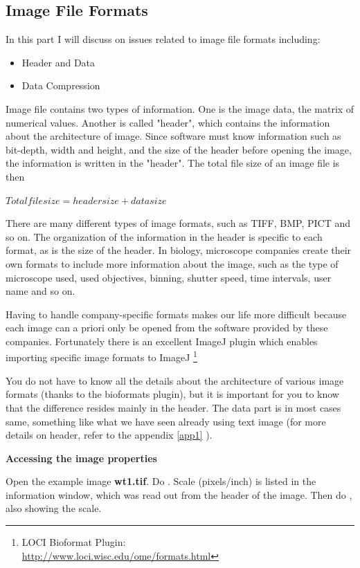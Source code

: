 \subsection{Image File Formats}

In this part I will discuss on issues related to image file formats including:

\begin{itemize}
	\item Header and Data
	\item Data Compression
\end{itemize}

Image file contains two types of information. 
One is the image data, the matrix of numerical values. 
Another is called "header", which contains the information about the architecture of image. 
Since software must know information such as bit-depth, width and height, and the size of 
the header before opening the image, the information is written in the "header". 
The total file size of an image file is then 

$Total file size = header size + data size$

There are many different types of image formats, such as TIFF, BMP, PICT and so
on. The organization of the information in the header is specific to each format, as is the size of the header. In biology, microscope companies create their own formats to
include more information about the image, such as the type of microscope used,
used objectives, binning, shutter speed, time intervals, user name and so on.

Having to handle company-specific formats makes our life more difficult because each image can a priori
only be opened from the software provided by these companies. Fortunately there
is an excellent ImageJ plugin which enables importing specific image formats to ImageJ
\footnote{\tab LOCI Bioformat Plugin:\\
\url{http://www.loci.wisc.edu/ome/formats.html}}

You do not have to know all the details about the architecture of various image
formats (thanks to the bioformats plugin), but it is important for you to know
that the difference resides mainly in the header. The data part is in most cases
same, something like what we have seen already using text image (for more
details on header, refer to the appendix \ref{app1} ).

\begin{indentexercise}{1}

\textbf{Accessing the image properties}

Open the example image \textbf{wt1.tif}. Do
. Scale (pixels/inch)
is listed in the information window, which was read out from the header
of the image. Then do ,
also showing the scale. 
\end{indentexercise}

